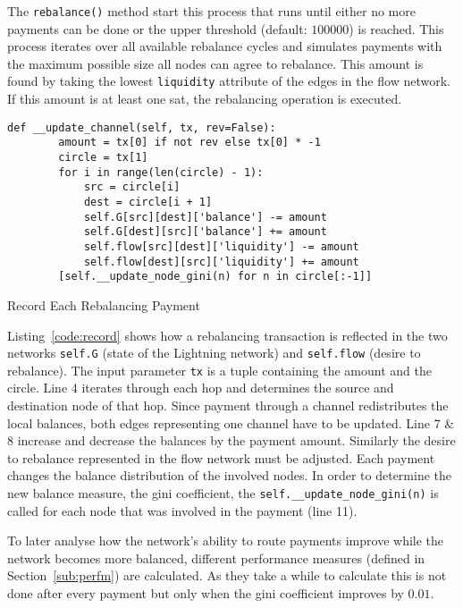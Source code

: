 \documentclass[final]{fhnwreport}       %
\begin{document}
The \texttt{rebalance()} method start this process that runs until either no more payments can be done or the upper threshold (default: $100000$) is reached. This process iterates over all available rebalance cycles and simulates payments with the maximum possible size all nodes can agree to rebalance. This amount is found by taking the lowest \texttt{liquidity} attribute of the edges in the flow network. If this amount is at least one sat, the rebalancing operation is executed. 

\begin{listing}[H]
  \begin{verbatim}
def __update_channel(self, tx, rev=False):
        amount = tx[0] if not rev else tx[0] * -1
        circle = tx[1]
        for i in range(len(circle) - 1):
            src = circle[i]
            dest = circle[i + 1]
            self.G[src][dest]['balance'] -= amount
            self.G[dest][src]['balance'] += amount
            self.flow[src][dest]['liquidity'] -= amount
            self.flow[dest][src]['liquidity'] += amount
        [self.__update_node_gini(n) for n in circle[:-1]]
  \end{verbatim}
  \caption{Record Each Rebalancing Payment}
  \label{code:record}
\end{listing}

Listing~\ref{code:record} shows how a rebalancing transaction is reflected in the two networks \texttt{self.G} (state of the Lightning network) and \texttt{self.flow} (desire to rebalance). The input parameter \texttt{tx} is a tuple containing the amount and the circle. Line 4 iterates through each hop and determines the source and destination node of that hop. Since payment through a channel redistributes the local balances, both edges representing one channel have to be updated. Line 7 \& 8 increase and decrease the balances by the payment amount. Similarly the desire to rebalance represented in the flow network must be adjusted. Each payment changes the balance distribution of the involved nodes. In order to determine the new balance measure, the \gls{gini} coefficient, the \texttt{self.__update_node_gini(n)} is called for each node that was involved in the payment (line 11).

To later analyse how the network's ability to route payments improve while the network becomes more balanced, different performance measures (defined in Section~\ref{sub:perfm}) are calculated. As they take a while to calculate this is not done after every payment but only when the \gls{gini} coefficient improves by $0.01$.
\end{document}
